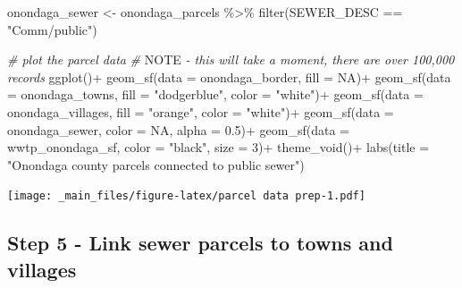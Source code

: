 \documentclass[
]{book}
\newenvironment{Shaded}{\begin{snugshade}}{\end{snugshade}}
\newcommand{\AlertTok}[1]{\textcolor[rgb]{0.94,0.16,0.16}{#1}}
\newcommand{\AttributeTok}[1]{\textcolor[rgb]{0.77,0.63,0.00}{#1}}
\newcommand{\CommentTok}[1]{\textcolor[rgb]{0.56,0.35,0.01}{\textit{#1}}}
\newcommand{\ConstantTok}[1]{\textcolor[rgb]{0.00,0.00,0.00}{#1}}
\newcommand{\DecValTok}[1]{\textcolor[rgb]{0.00,0.00,0.81}{#1}}
\newcommand{\FloatTok}[1]{\textcolor[rgb]{0.00,0.00,0.81}{#1}}
\newcommand{\FunctionTok}[1]{\textcolor[rgb]{0.00,0.00,0.00}{#1}}
\newcommand{\NormalTok}[1]{#1}
\newcommand{\OtherTok}[1]{\textcolor[rgb]{0.56,0.35,0.01}{#1}}
\newcommand{\SpecialCharTok}[1]{\textcolor[rgb]{0.00,0.00,0.00}{#1}}
\newcommand{\StringTok}[1]{\textcolor[rgb]{0.31,0.60,0.02}{#1}}
\begin{document}
\begin{Shaded}
\begin{Highlighting}[]
\NormalTok{onondaga\_sewer }\OtherTok{\textless{}{-}}\NormalTok{ onondaga\_parcels }\SpecialCharTok{\%\textgreater{}\%}
  \FunctionTok{filter}\NormalTok{(SEWER\_DESC }\SpecialCharTok{==} \StringTok{"Comm/public"}\NormalTok{)}

\CommentTok{\# plot the parcel data}
\CommentTok{\# }\AlertTok{NOTE}\CommentTok{ {-} this will take a moment, there are over 100,000 records}
\FunctionTok{ggplot}\NormalTok{()}\SpecialCharTok{+}
  \FunctionTok{geom\_sf}\NormalTok{(}\AttributeTok{data =}\NormalTok{ onondaga\_border, }\AttributeTok{fill =} \ConstantTok{NA}\NormalTok{)}\SpecialCharTok{+}
  \FunctionTok{geom\_sf}\NormalTok{(}\AttributeTok{data =}\NormalTok{ onondaga\_towns, }\AttributeTok{fill =} \StringTok{"dodgerblue"}\NormalTok{, }\AttributeTok{color =} \StringTok{"white"}\NormalTok{)}\SpecialCharTok{+}
  \FunctionTok{geom\_sf}\NormalTok{(}\AttributeTok{data =}\NormalTok{ onondaga\_villages, }\AttributeTok{fill =} \StringTok{"orange"}\NormalTok{, }\AttributeTok{color =} \StringTok{"white"}\NormalTok{)}\SpecialCharTok{+}
  \FunctionTok{geom\_sf}\NormalTok{(}\AttributeTok{data =}\NormalTok{ onondaga\_sewer, }\AttributeTok{color =} \ConstantTok{NA}\NormalTok{, }\AttributeTok{alpha =} \FloatTok{0.5}\NormalTok{)}\SpecialCharTok{+}
  \FunctionTok{geom\_sf}\NormalTok{(}\AttributeTok{data =}\NormalTok{ wwtp\_onondaga\_sf, }\AttributeTok{color =} \StringTok{"black"}\NormalTok{, }\AttributeTok{size =} \DecValTok{3}\NormalTok{)}\SpecialCharTok{+}
  \FunctionTok{theme\_void}\NormalTok{()}\SpecialCharTok{+}
  \FunctionTok{labs}\NormalTok{(}\AttributeTok{title =} \StringTok{"Onondaga county parcels connected to public sewer"}\NormalTok{)}
\end{Highlighting}
\end{Shaded}

\texttt{[image: \_main\_files/figure-latex/parcel data prep-1.pdf]}

\hypertarget{step-5---link-sewer-parcels-to-towns-and-villages}{%
\subsection{Step 5 - Link sewer parcels to towns and villages}\label{step-5---link-sewer-parcels-to-towns-and-villages}}
\end{document}
